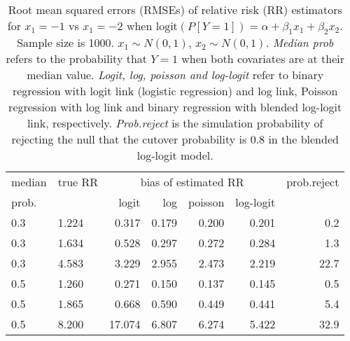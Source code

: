 \documentclass[12pt,a4paper]{article}
\begin{document}
\begin{table}[H] 
\small\sf\centering 
\caption{Root mean squared errors (RMSEs) of relative risk (RR) estimators for $x_1=-1$ vs $x_1=-2$ when $\mbox{logit}(P[Y=1])=\alpha+\beta_1 x_1 + \beta_2 x_2$. Sample size is 1000. $x_1 \sim $$N(0,1)$, $x_2 \sim N(0,1)$. {\it Median prob} refers to the probability that $Y=1$ when both covariates are at their median value. {\it Logit, log, poisson and log-logit} refer to binary regression with logit link (logistic regression) and log link, Poisson regression with log link and binary regression with blended log-logit link, respectively. {\it Prob.reject} is the simulation probability of rejecting the null that the cutover probability is $0.8$ in the blended log-logit model.} 
\begin{tabular}{llrrrrr} 
\toprule 
median & true RR & \multicolumn{4}{c}{bias of estimated RR} & prob.reject \\ 
prob. & & logit & log & poisson & log-logit  & \\ \midrule 
0.3 & 1.224 &  0.317 & 0.179 & 0.200 & 0.201 &  0.2 \\  
0.3 & 1.634 &  0.528 & 0.297 & 0.272 & 0.284 &  1.3 \\  
0.3 & 4.583 &  3.229 & 2.955 & 2.473 & 2.219 & 22.7 \\  
0.5 & 1.260 &  0.271 & 0.150 & 0.137 & 0.145 &  0.5 \\  
0.5 & 1.865 &  0.668 & 0.590 & 0.449 & 0.441 &  5.4 \\  
0.5 & 8.200 & 17.074 & 6.807 & 6.274 & 5.422 & 32.9 \\  
\bottomrule 
\end{tabular} 
\end{table} 
\end{document}
